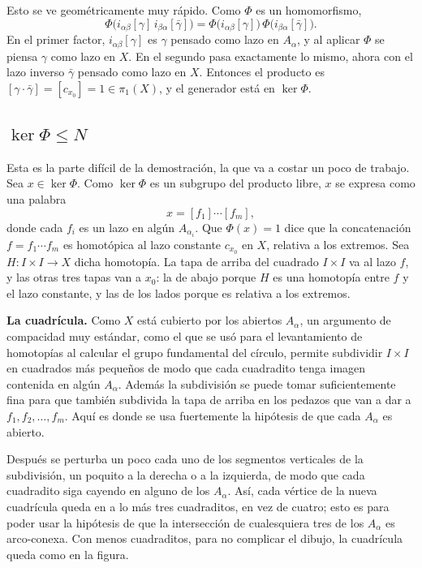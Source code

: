 \documentclass[11pt]{article}
\begin{document}
Esto se ve geométricamente muy rápido. Como $\Phi$ es un homomorfismo,
\[
  \Phi\bigl(i_{\alpha\beta}[\gamma]\,i_{\beta\alpha}[\bar\gamma]\bigr)=\Phi\bigl(i_{\alpha\beta}[\gamma]\bigr)\,\Phi\bigl(i_{\beta\alpha}[\bar\gamma]\bigr).
\]
En el primer factor, $i_{\alpha\beta}[\gamma]$ es $\gamma$ pensado como lazo en $A_\alpha$, y al aplicar $\Phi$ se piensa $\gamma$ como lazo en $X$. En el segundo pasa exactamente lo mismo, ahora con el lazo inverso $\bar\gamma$ pensado como lazo en $X$. Entonces el producto es $[\gamma\cdot\bar\gamma]=[c_{x_0}]=1\in\pi_1(X)$, y el generador está en $\ker\Phi$.

\subsection*{$\ker\Phi\leq N$}

Esta es la parte difícil de la demostración, la que va a costar un poco de trabajo. Sea $x\in\ker\Phi$. Como $\ker\Phi$ es un subgrupo del producto libre, $x$ se expresa como una palabra
\[
  x=[f_1]\cdots[f_m],
\]
donde cada $f_i$ es un lazo en algún $A_{\alpha_i}$. Que $\Phi(x)=1$ dice que la concatenación $f=f_1\cdots f_m$ es homotópica al lazo constante $c_{x_0}$ en $X$, relativa a los extremos. Sea $H\colon I\times I\to X$ dicha homotopía. La tapa de arriba del cuadrado $I\times I$ va al lazo $f$, y las otras tres tapas van a $x_0$: la de abajo porque $H$ es una homotopía entre $f$ y el lazo constante, y las de los lados porque es relativa a los extremos.

\noindent\textbf{La cuadrícula.} Como $X$ está cubierto por los abiertos $A_\alpha$, un argumento de compacidad muy estándar, como el que se usó para el levantamiento de homotopías al calcular el grupo fundamental del círculo, permite subdividir $I\times I$ en cuadrados más pequeños de modo que cada cuadradito tenga imagen contenida en algún $A_\alpha$. Además la subdivisión se puede tomar suficientemente fina para que también subdivida la tapa de arriba en los pedazos que van a dar a $f_1,f_2,\dots,f_m$. Aquí es donde se usa fuertemente la hipótesis de que cada $A_\alpha$ es abierto.

Después se perturba un poco cada uno de los segmentos verticales de la subdivisión, un poquito a la derecha o a la izquierda, de modo que cada cuadradito siga cayendo en alguno de los $A_\alpha$. Así, cada vértice de la nueva cuadrícula queda en a lo más tres cuadraditos, en vez de cuatro; esto es para poder usar la hipótesis de que la intersección de cualesquiera tres de los $A_\alpha$ es arco-conexa. Con menos cuadraditos, para no complicar el dibujo, la cuadrícula queda como en la figura.
\end{document}

